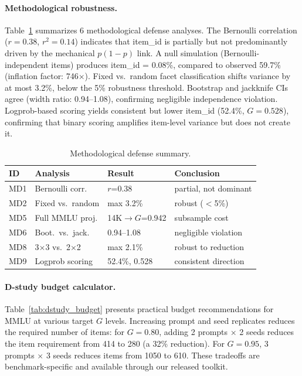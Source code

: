 \documentclass[11pt,letterpaper]{article}
\begin{document}
\paragraph{Methodological robustness.}
Table~\ref{tab:defense} summarizes 6 methodological defense analyses.
The Bernoulli correlation ($r = 0.38$, $r^2 = 0.14$) indicates that item\_id is partially but not predominantly driven by the mechanical $p(1{-}p)$ link.
A null simulation (Bernoulli-independent items) produces item\_id = 0.08\%, compared to observed 59.7\% (inflation factor: 746$\times$).
Fixed vs.\ random facet classification shifts variance by at most 3.2\%, below the 5\% robustness threshold.
Bootstrap and jackknife CIs agree (width ratio: 0.94--1.08), confirming negligible independence violation.
Logprob-based scoring yields consistent but lower item\_id (52.4\%, $G = 0.528$), confirming that binary scoring amplifies item-level variance but does not create it.

\begin{table}[t]
\centering
\caption{Methodological defense summary.}
\label{tab:defense}
\small
\begin{tabular}{@{}llll@{}}
\toprule
ID & Analysis & Result & Conclusion \\
\midrule
MD1 & Bernoulli corr. & $r$=0.38 & partial, not dominant \\
MD2 & Fixed vs.\ random & max 3.2\% & robust ($<$5\%) \\
MD5 & Full MMLU proj. & 14K$\rightarrow$$G$=0.942 & subsample cost \\
MD6 & Boot.\ vs.\ jack. & 0.94--1.08 & negligible violation \\
MD8 & 3$\times$3 vs.\ 2$\times$2 & max 2.1\% & robust to reduction \\
MD9 & Logprob scoring & 52.4\%, 0.528 & consistent direction \\
\bottomrule
\end{tabular}
\end{table}

\paragraph{D-study budget calculator.}
Table~\ref{tab:dstudy_budget} presents practical budget recommendations for MMLU at various target $G$ levels.
Increasing prompt and seed replicates reduces the required number of items: for $G = 0.80$, adding 2 prompts $\times$ 2 seeds reduces the item requirement from 414 to 280 (a 32\% reduction).
For $G = 0.95$, 3 prompts $\times$ 3 seeds reduces items from 1050 to 610.
These tradeoffs are benchmark-specific and available through our released toolkit.
\end{document}
